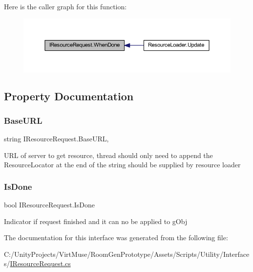 Here is the caller graph for this function\+:
\nopagebreak
\begin{figure}[H]
\begin{center}
\leavevmode
\includegraphics[width=350pt]{interface_i_resource_request_a056e427fa6233602456ccb2d4c405aa0_icgraph}
\end{center}
\end{figure}


\subsection{Property Documentation}
\mbox{\label{interface_i_resource_request_a6da6ac392229cc1a8a09d420ee4357dd}} 
\subsubsection{\texorpdfstring{Base\+U\+RL}{BaseURL}}
{\footnotesize\ttfamily string I\+Resource\+Request.\+Base\+U\+RL\hspace{0.3cm}{\ttfamily [get]}, {\ttfamily [set]}}



U\+RL of server to get resource, thread should only need to append the Resource\+Locator at the end of the string should be supplied by resource loader 

\mbox{\label{interface_i_resource_request_a3f805c8d561c119c795598b98611fb90}} 
\subsubsection{\texorpdfstring{Is\+Done}{IsDone}}
{\footnotesize\ttfamily bool I\+Resource\+Request.\+Is\+Done\hspace{0.3cm}{\ttfamily [get]}}



Indicator if request finished and it can no be applied to g\+Obj 



The documentation for this interface was generated from the following file\+:\begin{DoxyCompactItemize}
\item 
C\+:/\+Unity\+Projects/\+Virt\+Muse/\+Room\+Gen\+Prototype/\+Assets/\+Scripts/\+Utility/\+Interfaces/\mbox{\hyperlink{_i_resource_request_8cs}{I\+Resource\+Request.\+cs}}\end{DoxyCompactItemize}
